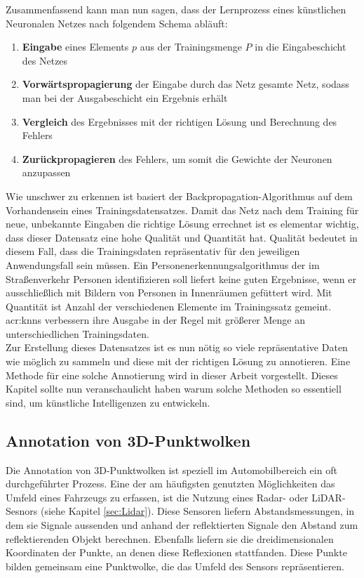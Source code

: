 Zusammenfassend kann man nun sagen, dass der Lernprozess eines künstlichen Neuronalen Netzes nach folgendem Schema abläuft:

\begin{enumerate}
\item \textbf{Eingabe} eines Elements \(p\) aus der Trainingsmenge \(P\) in die Eingabeschicht des Netzes
\item \textbf{Vorwärtspropagierung} der Eingabe durch das Netz gesamte Netz, sodass man bei der Ausgabeschicht ein Ergebnis erhält
\item \textbf{Vergleich} des Ergebnisses mit der richtigen Lösung und Berechnung des Fehlers
\item \textbf{Zurückpropagieren} des Fehlers, um somit die Gewichte der Neuronen anzupassen
\end{enumerate}

Wie unschwer zu erkennen ist basiert der Backpropagation-Algorithmus auf dem Vorhandensein eines Trainingsdatensatzes. Damit das Netz nach dem Training für neue, unbekannte Eingaben die richtige Lösung errechnet ist es elementar wichtig, dass dieser Datensatz eine hohe Qualität und Quantität hat. Qualität bedeutet in diesem Fall, dass die Trainingsdaten repräsentativ für den jeweiligen Anwendungsfall sein müssen. Ein Personenerkennungsalgorithmus der im Straßenverkehr Personen identifizieren soll liefert keine guten Ergebnisse, wenn er ausschließlich mit Bildern von Personen in Innenräumen gefüttert wird. Mit Quantität ist Anzahl der verschiedenen Elemente im Trainingssatz gemeint. \acrshort{acr:knn}s verbessern ihre Ausgabe in der Regel mit größerer Menge an unterschiedlichen Trainingsdaten.\\

Zur Erstellung dieses Datensatzes ist es nun nötig so viele repräsentative Daten wie möglich zu sammeln und diese mit der richtigen Lösung zu annotieren. Eine Methode für eine solche Annotierung wird in dieser Arbeit vorgestellt. Dieses Kapitel sollte nun veranschaulicht haben warum solche Methoden so essentiell sind, um künstliche Intelligenzen zu entwickeln.


\subsection{Annotation von 3D-Punktwolken}

Die Annotation von 3D-Punktwolken ist speziell im Automobilbereich ein oft durchgeführter Prozess. Eine der am häufigsten genutzten Möglichkeiten das Umfeld eines Fahrzeugs zu erfassen, ist die Nutzung eines Radar- oder LiDAR-Sesnors (siehe Kapitel \ref{sec:Lidar}). Diese Sensoren liefern Abstandsmessungen, in dem sie Signale aussenden und anhand der reflektierten Signale den Abstand zum reflektierenden Objekt berechnen. Ebenfalls liefern sie die dreidimensionalen Koordinaten der Punkte, an denen diese Reflexionen stattfanden. Diese Punkte bilden gemeinsam eine Punktwolke, die das Umfeld des Sensors repräsentieren. 

